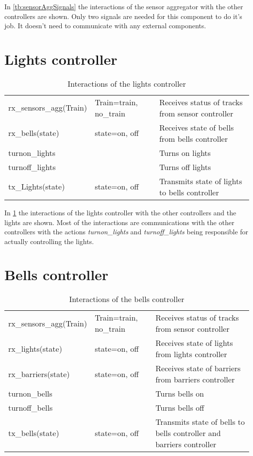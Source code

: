 \documentclass[final]{report}
\begin{document}
In \cref{tb:sensorAggSignals} the interactions of the sensor aggregator with the other controllers are shown. Only two signals are needed for this component to do it's job. It doesn't need to communicate with any external components.

\section{Lights controller}
\begin{table}[H]
\centering
\begin{tabular}{|l|l|l|}
\hline
rx\_sensors\_agg(Train)  & Train=train, no\_train & Receives status of tracks from sensor controller \\
rx\_bells(state)   & state=on, off          & Receives state of bells from bells controller               \\ \hline
turnon\_lights &         & Turns on lights                                     \\
turnoff\_lights & & Turns off lights\\
tx\_Lights(state)  & state=on, off          & Transmits state of lights to bells controller               \\ \hline
\end{tabular}
\caption{Interactions of the lights controller}
\label{tb:lightsSignals}
\end{table}

In \cref{tb:lightsSignals} the interactions of the lights controller with the other controllers and the lights are shown. Most of the interactions are communications with the other controllers with the actions \textit{turnon\_lights} and \textit{turnoff\_lights} being responsible for actually controlling the lights.

\section{Bells controller}
\begin{table}[H]
\centering
\begin{tabular}{|l|l|l|}
\hline
rx\_sensors\_agg(Train)   & Train=train, no\_train & Receives status of tracks from sensor controller           \\
rx\_lights(state)   & state=on, off          & Receives state of lights from lights controller                      \\
rx\_barriers(state) & state=on, off          & Receives state of barriers from barriers controller                  \\ \hline
turnon\_bells   &          & Turns bells on                                              \\
turnoff\_bells   &          & Turns bells off                                              \\
tx\_bells(state)    & state=on, off          & Transmits state of bells to bells controller and barriers controller\\ \hline
\end{tabular}
\caption{Interactions of the bells controller}
\label{tb:bellsSignals}
\end{table}
\end{document}
